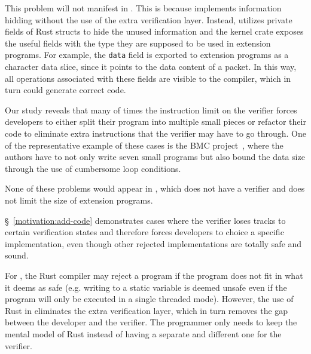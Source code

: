 This problem will not manifest in \projname{}.
This is because \projname{} implements information hidding without the use of
    the extra verification layer.
Instead, \projname{} utilizes private fields of Rust structs to hide the unused
    information and the kernel crate exposes the useful fields with the type
    they are supposed to be used in extension programs.
For example, the \texttt{data} field is exported to extension programs as a
    character data slice, since it points to the data content of a packet.
In this way, all operations associated with these fields are visible to the
    compiler, which in turn could generate correct code.

Our study reveals that many of times the instruction limit on the verifier
    forces developers to either split their program into multiple small pieces
    or refactor their code to eliminate extra instructions that the verifier
    may have to go through.
One of the representative example of these cases is the BMC project~\cite{BMC},
    where the authors have to not only write seven small programs but also
    bound the data size through the use of cumbersome loop conditions.

None of these problems would appear in \projname{}, which does not
    have a verifier and does not limit the size of extension programs.

\S~\ref{motivation:add-code} demonstrates cases where the verifier loses tracks
    to certain verification states and therefore forces developers to
    choice a specific implementation, even though other rejected
    implementations are totally safe and sound.

For \projname{}, the Rust compiler may reject a program if the program does not
    fit in what it deems as safe (e.g. writing to a static variable is deemed
    unsafe even if the program will only be executed in a single threaded
    mode).
However, the use of Rust in \projname{} eliminates the extra verification layer,
    which in turn removes the gap between the developer and the verifier.
The programmer only needs to keep the mental model of Rust instead of having a
    separate and different one for the verifier.


